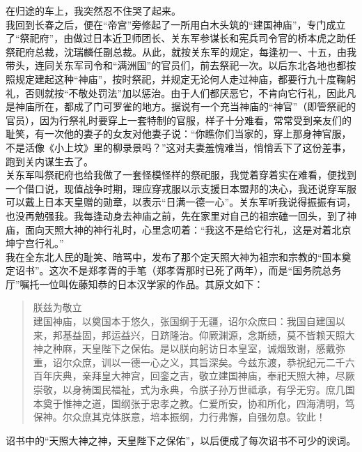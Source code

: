 在归途的车上，我突然忍不住哭了起来。\\

我回到长春之后，便在“帝宫”旁修起了一所用白木头筑的“建国神庙”，专门成立了“祭祀府”，由做过日本近卫师团长、关东军参谋长和宪兵司令官的桥本虎之助任祭祀府总裁，沈瑞麟任副总裁。从此，就按关东军的规定，每逢初一、十五，由我带头，连同关东军司令和“满洲国”的官员们，前去祭祀一次。以后东北各地也都按照规定建起这种“神庙”，按时祭祀，并规定无论何人走过神庙，都要行九十度鞠躬礼，否则就按“不敬处罚法”加以惩治。由于人们都厌恶它，不肯向它行礼，因此凡是神庙所在，都成了门可罗雀的地方。据说有一个充当神庙的“神官”（即管祭祀的官员），因为行祭礼时要穿上一套特制的官服，样子十分难看，常常受到亲友们的耻笑，有一次他的妻子的女友对他妻子说：“你瞧你们当家的，穿上那身神官服，不是活像《小上坟》里的柳录景吗？”这对夫妻羞愧难当，悄悄丢下了这份差事，跑到关内谋生去了。\\

关东军叫祭祀府也给我做了一套怪模怪样的祭祀服，我觉着穿着实在难看，便找到一个借口说，现值战争时期，理应穿戎服以示支援日本盟邦的决心，我还说穿军服可以戴上日本天皇赠的勋章，以表示“日满一德一心”。关东军听我说得振振有词，也没再勉强我。我每逢动身去神庙之前，先在家里对自己的祖宗磕一回头，到了神庙，面向天照大神的神行礼时，心里念叨着：“我这不是给它行礼，这是对着北京坤宁宫行礼。”\\

我在全东北人民的耻笑、暗骂中，发布了那个定天照大神为祖宗和宗教的“国本奠定诏书”。这次不是郑孝胥的手笔（郑孝胥那时已死了两年），而是“国务院总务厅”嘱托一位叫佐藤知恭的日本汉学家的作品。其原文如下：\\

\begin{quote}
	朕兹为敬立\\

建国神庙，以奠国本于悠久，张国纲于无疆，诏尔众庶曰：我国自建国以来，邦基益固，邦运益兴，日跻隆治。仰厥渊源，念斯绩，莫不皆赖天照大神之种麻，天皇陛下之保佑。是以朕向躬访日本皇室，诚烟致谢，感戴弥重，诏尔众庶，训以一德一心之义，其旨深矣。今兹东渡，恭祝纪元二千六百年庆典，亲拜皇大神宫，回銮之吉，敬立建国神庙，奉祀天照大神，尽厥崇敬，以身祷国民福祉，式为永典，令朕子孙万世祗承，有孚无穷。庶几国本奠于惟神之道，国纲张于忠孝之教。仁爱所安，协和所化，四海清明，笃保神。尔众庶其克体朕意，培本振纲，力行弗懈，自强勿息。钦此！\\
\end{quote}

诏书中的“天照大神之神，天皇陛下之保佑”，以后便成了每次诏书不可少的谀词。\\


